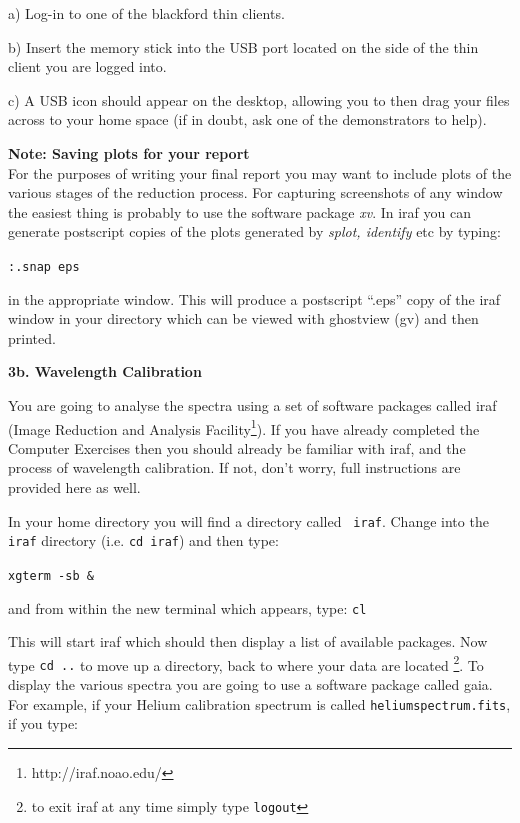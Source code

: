 \documentclass[12pt]{article}
\begin{document}
a) Log-in to one of the blackford thin clients.\\

\medskip

b) Insert the memory stick into the USB port located on the side of the thin
client you are logged into.\\

\medskip

c) A USB icon should appear on the desktop, allowing you to then drag your files across
to your home space (if in doubt, ask one of the demonstrators to help).\\

\medskip

{\large {\bf Note: Saving plots for your report}}\\
For the purposes of writing your final report you may want to include
plots of the various stages of the reduction process. For capturing
screenshots of any window the easiest thing is probably to use the
software package {\it xv}. In {\sc iraf} you can generate
postscript copies of the plots generated by {\it splot, identify} etc
by typing: 

{\tt :.snap eps}

in the appropriate window. This will produce a postscript ``.eps''
copy of the {\sc iraf} window in your directory which can be viewed
with ghostview (gv) and then printed.

\newpage


{\bf 3b. Wavelength Calibration}

\noindent
You are going to analyse the spectra using a set of software packages 
called {\sc iraf} (Image Reduction and Analysis
Facility\footnote{http://iraf.noao.edu/}). If you have already
completed the Computer Exercises then you should already be familiar
with {\sc iraf}, and the process of wavelength calibration. If not,
don't worry, full instructions are provided here as well.

In your home directory you will find a directory called {\tt
  iraf}. Change into the {\tt iraf} directory (i.e. {\tt cd iraf}) and
  then type:

{\tt \verb,xgterm -sb &,}

\noindent
and from within the new terminal which appears, type: {\tt cl}

\noindent
This will start {\sc iraf} which should then display a list of available
packages. Now type {\tt cd ..} to move up a directory, back to where
your data are located \footnote{to exit {\sc iraf} at any time simply
  type {\tt logout}}. To display the various spectra you are going to use a software package
called {\sc gaia}. For example, if your Helium calibration spectrum is
called {\tt heliumspectrum.fits}, if you type:
\end{document}
